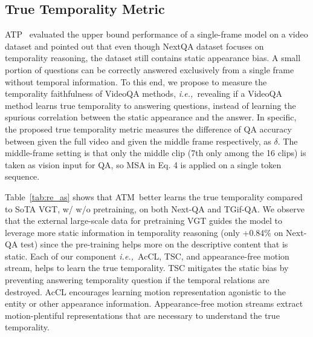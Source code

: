 \documentclass[sigconf]{acmart}
\newcommand{\methodname}{ATM~}
\newcommand{\ie}{\emph{i.e.,~}}
\begin{document}
\subsection{True Temporality Metric}
ATP~\cite{buch2022revisiting} evaluated the upper bound performance of a single-frame model on a video dataset and pointed out that even though NextQA dataset focuses on temporality reasoning, the dataset still contains static appearance bias. 
A small portion of questions can be correctly answered exclusively from a single frame without temporal information. 
To this end, we propose to measure the temporality faithfulness of VideoQA methods, \ie revealing if a VideoQA method learns true temporality to answering questions, instead of learning the spurious correlation between the static appearance and the answer. 
In specific, the proposed true temporality metric measures the difference of QA accuracy between given the full video and given the middle frame respectively, as $\delta$.
The middle-frame setting is that only the middle clip (7th only among the 16 clips) is taken as vision input for QA, so MSA in Eq. 4 is applied on a single token sequence.

Table~\ref{tab:re_as} shows that \methodname better learns the true temporality compared to SoTA VGT, w/ w/o pretraining, on both Next-QA and TGif-QA. We observe that the external large-scale data for pretraining VGT guides the model to leverage more static information in temporality reasoning (only +0.84\% on Next-QA test) since the pre-training helps more on the descriptive content that is static.
Each of our component \ie AcCL, TSC, and appearance-free motion stream, helps to learn the true temporality. TSC mitigates the static bias by preventing answering temporality question if the temporal relations are destroyed. AcCL encourages learning motion representation agonistic to the entity or other appearance information. Appearance-free motion streams extract motion-plentiful representations that are necessary to understand the true temporality. 
\end{document}
